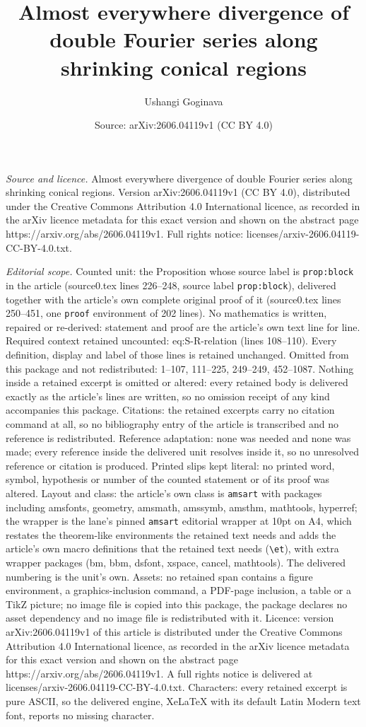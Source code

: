 \documentclass[10pt,a4paper]{amsart}
\title[Almost everywhere divergence of double Fourier series along ]{Almost everywhere divergence of double Fourier series along shrinking conical regions}
\author{Ushangi Goginava}
\date{Source: arXiv:2606.04119v1 (CC BY 4.0)}
\begin{document}
\maketitle

\noindent\emph{Source and licence.} Almost everywhere divergence of double Fourier series along shrinking conical regions. Version arXiv:2606.04119v1 (CC BY 4.0), distributed under the Creative Commons Attribution 4.0 International licence, as recorded in the arXiv licence metadata for this exact version and shown on the abstract page https://arxiv.org/abs/2606.04119v1. Full rights notice: licenses/arxiv-2606.04119-CC-BY-4.0.txt.\par\smallskip

\noindent\textit{Editorial scope.} Counted unit: the Proposition whose source label is \texttt{prop:block} in the article (source0.tex lines 226--248, source label \texttt{prop:block}), delivered together with the article's own complete original proof of it (source0.tex lines 250--451, one \texttt{proof} environment of 202 lines). No mathematics is written, repaired or re-derived: statement and proof are the article's own text line for line. Required context retained uncounted: eq:S-R-relation (lines 108--110). Every definition, display and label of those lines is retained unchanged. Omitted from this package and not redistributed: 1--107, 111--225, 249--249, 452--1087. Nothing inside a retained excerpt is omitted or altered: every retained body is delivered exactly as the article's lines are written, so no omission receipt of any kind accompanies this package. Citations: the retained excerpts carry no citation command at all, so no bibliography entry of the article is transcribed and no reference is redistributed. Reference adaptation: none was needed and none was made; every reference inside the delivered unit resolves inside it, so no unresolved reference or citation is produced. Printed slips kept literal: no printed word, symbol, hypothesis or number of the counted statement or of its proof was altered. Layout and class: the article's own class is \texttt{amsart} with packages including amsfonts, geometry, amsmath, amssymb, amsthm, mathtools, hyperref; the wrapper is the lane's pinned \texttt{amsart} editorial wrapper at 10pt on A4, which restates the theorem-like environments the retained text needs and adds the article's own macro definitions that the retained text needs (\texttt{\textbackslash et}), with extra wrapper packages (bm, bbm, dsfont, xspace, cancel, mathtools). The delivered numbering is the unit's own. Assets: no retained span contains a figure environment, a graphics-inclusion command, a PDF-page inclusion, a table or a TikZ picture; no image file is copied into this package, the package declares no asset dependency and no image file is redistributed with it. Licence: version arXiv:2606.04119v1 of this article is distributed under the Creative Commons Attribution 4.0 International licence, as recorded in the arXiv licence metadata for this exact version and shown on the abstract page https://arxiv.org/abs/2606.04119v1. A full rights notice is delivered at licenses/arxiv-2606.04119-CC-BY-4.0.txt. Characters: every retained excerpt is pure ASCII, so the delivered engine, XeLaTeX with its default Latin Modern text font, reports no missing character.
\end{document}
